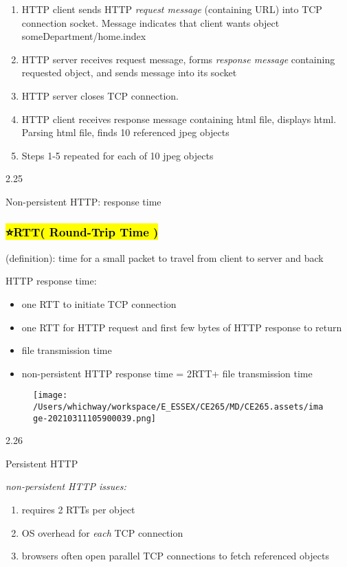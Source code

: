 \documentclass[
]{article}
\begin{document}
\begin{enumerate}
\def\labelenumi{\arabic{enumi}.}
\item
  HTTP client sends HTTP \emph{request message} (containing URL) into
  TCP connection socket. Message indicates that client wants object
  someDepartment/home.index
\item
  HTTP server receives request message, forms \emph{response message}
  containing requested object, and sends message into its socket
\item
  HTTP server closes TCP connection.
\item
  HTTP client receives response message containing html file, displays
  html. Parsing html file, finds 10 referenced jpeg objects
\item
  Steps 1-5 repeated for each of 10 jpeg objects
\end{enumerate}

2.25

Non-persistent HTTP: response time

\hypertarget{rtt-round-trip-time-}{%
\subsubsection{\texorpdfstring{\hl{⭐️RTT( Round-Trip Time
)}}{⭐️RTT( Round-Trip Time )}}\label{rtt-round-trip-time-}}

(definition): time for a small packet to travel from client to server
and back

HTTP response time:

\begin{itemize}
\item
  one RTT to initiate TCP connection
\item
  one RTT for HTTP request and first few bytes of HTTP response to
  return
\item
  file transmission time
\item
  non-persistent HTTP response time = 2RTT+ file transmission time
\end{itemize}

\begin{figure}
\centering
\texttt{[image: /Users/whichway/workspace/E\_ESSEX/CE265/MD/CE265.assets/image-20210311105900039.png]}
\caption{}
\end{figure}

2.26

Persistent HTTP

\emph{non-persistent HTTP issues:}

\begin{enumerate}
\def\labelenumi{\arabic{enumi}.}
\item
  requires 2 RTTs per object
\item
  OS overhead for \emph{each} TCP connection
\item
  browsers often open parallel TCP connections to fetch referenced
  objects
\end{enumerate}
\end{document}
